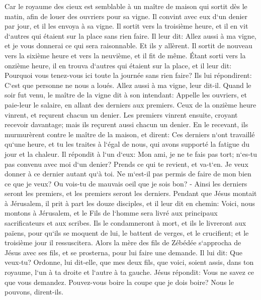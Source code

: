 \verse Car le royaume des cieux est semblable à un maître de maison qui sortit dès le matin, afin de louer des ouvriers pour sa vigne. 
\verse Il convint avec eux d`un denier par jour, et il les envoya à sa vigne. 
\verse Il sortit vers la troisième heure, et il en vit d`autres qui étaient sur la place sans rien faire. 
\verse Il leur dit: Allez aussi à ma vigne, et je vous donnerai ce qui sera raisonnable. 
\verse Et ils y allèrent. Il sortit de nouveau vers la sixième heure et vers la neuvième, et il fit de même. 
\verse Étant sorti vers la onzième heure, il en trouva d`autres qui étaient sur la place, et il leur dit: Pourquoi vous tenez-vous ici toute la journée sans rien faire? 
\verse Ils lui répondirent: C`est que personne ne nous a loués. Allez aussi à ma vigne, leur dit-il. 
\verse Quand le soir fut venu, le maître de la vigne dit à son intendant: Appelle les ouvriers, et paie-leur le salaire, en allant des derniers aux premiers. 
\verse Ceux de la onzième heure vinrent, et reçurent chacun un denier. 
\verse Les premiers vinrent ensuite, croyant recevoir davantage; mais ils reçurent aussi chacun un denier. 
\verse En le recevant, ils murmurèrent contre le maître de la maison, 
\verse et dirent: Ces derniers n`ont travaillé qu`une heure, et tu les traites à l`égal de nous, qui avons supporté la fatigue du jour et la chaleur. 
\verse Il répondit à l`un d`eux: Mon ami, je ne te fais pas tort; n`es-tu pas convenu avec moi d`un denier? 
\verse Prends ce qui te revient, et va-t`en. Je veux donner à ce dernier autant qu`à toi. 
\verse Ne m`est-il pas permis de faire de mon bien ce que je veux? Ou vois-tu de mauvais oeil que je sois bon? - 
\verse Ainsi les derniers seront les premiers, et les premiers seront les derniers. 
\verse Pendant que Jésus montait à Jérusalem, il prit à part les douze disciples, et il leur dit en chemin: 
\verse Voici, nous montons à Jérusalem, et le Fils de l`homme sera livré aux principaux sacrificateurs et aux scribes. Ils le condamneront à mort, 
\verse et ils le livreront aux païens, pour qu`ils se moquent de lui, le battent de verges, et le crucifient; et le troisième jour il ressuscitera. 
\verse Alors la mère des fils de Zébédée s`approcha de Jésus avec ses fils, et se prosterna, pour lui faire une demande. 
\verse Il lui dit: Que veux-tu? Ordonne, lui dit-elle, que mes deux fils, que voici, soient assis, dans ton royaume, l`un à ta droite et l`autre à ta gauche. 
\verse Jésus répondit: Vous ne savez ce que vous demandez. Pouvez-vous boire la coupe que je dois boire? Nous le pouvons, dirent-ils. 
